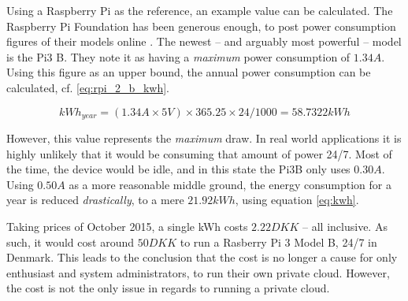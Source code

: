 			Using a Raspberry Pi as the reference, an example value can be calculated. The Raspberry Pi Foundation has been generous enough, to post power consumption figures of their models online \cite{raspberrypi_power}. The newest -- and arguably most powerful -- model is the Pi3 B. They note it as having a \emph{maximum} power consumption of $1.34A$. Using this figure as an upper bound, the annual power consumption can be calculated, cf. \ref{eq:rpi_2_b_kwh}.




			\begin{equation}
				kWh_{year} = (1.34A \times 5V ) \times 365.25 \times 24 / 1000 = 58.7322kWh
				\label{eq:rpi_2_b_kwh}
			\end{equation}

			


			However, this value represents the \emph{maximum} draw. In real world applications it is highly unlikely that it would be consuming that amount of power 24/7. Most of the time, the device would be idle, and in this state the Pi3B only uses $0.30A$. Using $0.50A$ as a more reasonable middle ground, the energy consumption for a year is reduced \emph{drastically}, to a mere $21.92kWh$, using equation \ref{eq:kwh}. 

			Taking prices of October 2015, a single kWh costs $2.22DKK$ \cite{energi_price} -- all inclusive. As such, it would cost around $50DKK$ to run a Rasberry Pi 3 Model B, 24/7 in Denmark. This leads to the conclusion that the cost is no longer a cause for only enthusiast and system administrators, to run their own private cloud. However, the cost is not the only issue in regards to running a private cloud.


